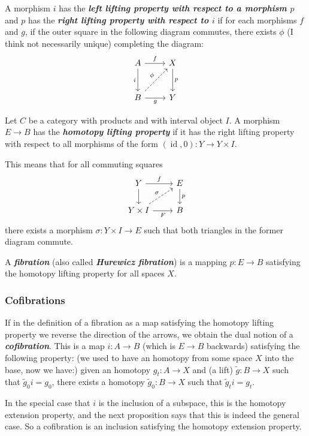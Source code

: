 \begin{defn}
	A morphism $i$ has the \textbf{\textit{left lifting property with respect to a morphism $p$}} and $p$ has the \textbf{\textit{right lifting property with respect to $i$}} if for each morphisms $f$ and $g$, if the outer square in the following diagram commutes, there exists $\phi$ (I think not necessarily unique) completing the diagram:
	\[\begin{tikzcd}[row sep=large]
		A\arrow[r,"f"]\arrow[d,"i",swap]&X\arrow[d,"p"]\\
		B\arrow[r,"g",swap]\arrow[ur,dashed,"\phi"]&Y
	\end{tikzcd}\]
\end{defn}

\begin{defn} Let $C$ be a category with products and with interval object $I$. A morphism $E\to B$ has the \textbf{\textit{homotopy lifting property}} if it has the right lifting property with respect to all morphisms of the form $(\operatorname{id},0):Y\to Y\times I$.
	
	This means that for all commuting squares
	\[\begin{tikzcd}
		Y\arrow[r,"f"]\arrow[d]&E\arrow[d,"p"]\\
		Y\times I\arrow[r,swap,"F"]\arrow[ur,dashed,"\sigma"]&B
	\end{tikzcd}\]
	there exists a morphism $\sigma:Y\times I\to E$ such that both triangles in the former diagram commute.
	
	A \textbf{\textit{fibration}} (also called \textbf{\textit{Hurewicz fibration}}) is a mapping $p:E\to B$ satisfying the homotopy lifting property for all spaces $X$.
\end{defn}

\subsubsection{Cofibrations}

\begin{defn}[Hatcher]
	If in the definition of a fibration as a map satisfying the homotopy lifting property we reverse the direction of the arrows, we obtain the dual notion of a \textit{\textbf{cofibration}}. This is a map $i:A\to B$ {\color{persimmon}(which is $E\to B$ backwards)} satisfying the following property: {\color{persimmon}(we used to have an homotopy from some space $X$ into the base, now we have:)} given an homotopy $g_{t}:A\to X$ and {\color{persimmon}(a lift)}  $\tilde{g}:B\to X$ such that $\tilde{g}_{0}i=g_{0}$, there exists a homotopy $\tilde{g}_{0}:B\to X$ such that $\tilde{g}_{t}i=g_{t}$.

	In the special case that $i$ is the inclusion of a subspace, this is the homotopy extension property, and the next proposition says that this is indeed the general case. So a cofibration is an inclusion satisfying the homotopy extension property.
\end{defn}

